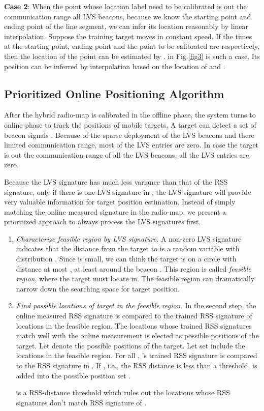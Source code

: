 \documentclass[conference, 10pt]{IEEEtran}
\begin{document}
\textbf{Case 2}: When the point whose location label need to be calibrated is out the communication range all LVS beacons, because we know the starting point and ending point of the line segment, we can infer its location reasonably by linear interpolation. Suppose the training target moves in constant speed. If the times at the starting point, ending point and the point to be calibrated are  respectively, then the location of the point can be estimated by .  in Fig.\ref{fig3} is such a case. Its position can be inferred by interpolation based on the location of  and . 

\subsection{Prioritized Online Positioning Algorithm}
After the hybrid radio-map is calibrated in the offline phase, the system turns to online phase to track the positions of mobile targets. A target can detect a set of beacon signals . Because of the sparse deployment of the LVS beacons and there limited communication range, most of the LVS entries are zero. In case the target is out the communication range of all the LVS beacons, all the LVS entries are zero. 

Because the LVS signature has much less variance than that of the RSS signature, only if there is one LVS signature in , the LVS signature will provide very valuable information for target position estimation. Instead of simply matching the online measured signature in the radio-map, we present a prioritized approach to always process the LVS signatures first. 
\begin{enumerate}
\item \emph{Characterize feasible region by LVS signature.} A non-zero LVS signature  indicates that the distance from the target to  is a random variable with distribution . Since  is small, we can think the target is on a circle with distance at most , at least  around the beacon . This region is called \emph{feasible region}, where the target must locate in. The feasible region can dramatically narrow down the searching space for target position. 
\item \emph{Find possible locations of target in the feasible region.} In the second step, the online measured RSS signature is compared to the trained RSS signature of locations in the feasible region. The locations whose trained RSS signatures match well with the online measurement is elected as possible positions of the  target. Let  denote the possible positions of the target. Let set  include the locations in the feasible region. For all , 's trained RSS signature is compared to the RSS signature in . If , i.e., the RSS distance is less than a threshold,  is added into the possible position set . 

 is a RSS-distance threshold which rules out the locations whose RSS signatures don't match RSS signature of .
\end{enumerate}
\end{document}
